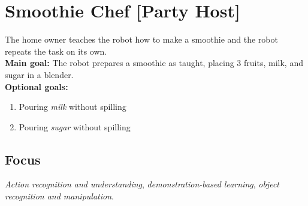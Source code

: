 \section{Smoothie Chef [Party Host]}
\label{test:smoothie-chef}
The home owner teaches the robot how to make a smoothie and the robot repeats the task on its own.\\

\noindent \textbf{Main goal:} The robot prepares a smoothie as taught, placing 3 fruits, milk, and sugar in a blender.\\

\noindent \textbf{Optional goals:}
\begin{enumerate}[nosep]
	\item Pouring \emph{milk} without spilling
	\item Pouring \emph{sugar} without spilling
\end{enumerate}


\subsection*{Focus}
\emph{Action recognition and understanding}, \emph{demonstration-based learning}, \emph{object recognition and manipulation}.

